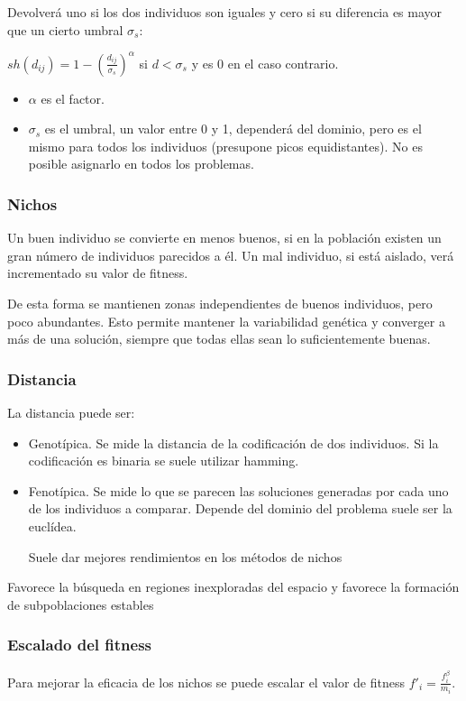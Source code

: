 \documentclass[12pt, twoside, openright]{report} %
\begin{document}
Devolverá uno si los dos individuos son iguales y cero si su diferencia es mayor que un cierto umbral $\sigma_s$:

$sh(d_{ij}) = 1- \left( \frac{d_{ij}}{\sigma_s} \right)^\alpha$ si $d<\sigma_s$ y es 0 en el caso contrario. 
\begin{itemize}
	\item $\alpha$ es el factor.
	\item $\sigma_s$ es el umbral, un valor entre 0 y 1, dependerá del dominio, pero es el mismo para todos los individuos (presupone picos equidistantes). No es posible asignarlo en todos los problemas.
\end{itemize}

\subsubsection{Nichos}
Un buen individuo se convierte en menos buenos, si en la población existen un gran número de individuos parecidos a él. Un mal individuo, si está aislado, verá incrementado su valor de fitness.

De esta forma se mantienen zonas independientes de buenos individuos, pero poco abundantes. Esto permite mantener la variabilidad genética y converger a más de una solución, siempre que todas ellas sean lo suficientemente buenas.

\subsubsection{Distancia}
La distancia puede ser:
\begin{itemize}
	\item Genotípica. Se mide la distancia de la codificación de dos individuos. Si la codificación es binaria se suele utilizar hamming.
	\item Fenotípica. Se mide lo que se parecen las soluciones generadas por cada uno de los individuos a comparar. Depende del dominio del problema suele ser la euclídea.
	
	Suele dar mejores rendimientos en los métodos de nichos
\end{itemize}

Favorece la búsqueda en regiones inexploradas del espacio y favorece la formación de subpoblaciones estables

\subsubsection{Escalado del fitness}
Para mejorar la eficacia de los nichos se puede escalar el valor de fitness $f'_i=\frac{f^\beta_i}{m_i}$.
\end{document}
